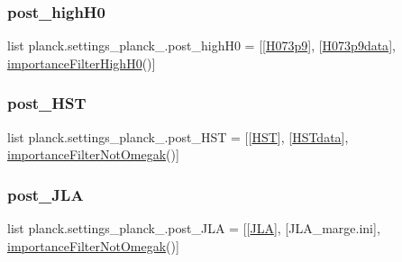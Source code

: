 \subsubsection{\texorpdfstring{post\+\_\+high\+H0}{post\_highH0}}
{\footnotesize\ttfamily list planck.\+settings\+\_\+planck\+\_.\+post\+\_\+high\+H0 = \mbox{[}\mbox{[}\mbox{\hyperlink{namespaceplanck_1_1settings__planck__2015_aafef97d4fa4c419c1ae40783e5ee77bc}{H073p9}}\mbox{]}, \mbox{[}\mbox{\hyperlink{namespaceplanck_1_1settings__planck__2015_a149e32b6407ecf68b56504a5911c02ee}{H073p9data}}\mbox{]}, \mbox{\hyperlink{classplanck_1_1settings__planck__2015_1_1importanceFilterHighH0}{importance\+Filter\+High\+H0}}()\mbox{]}}

\mbox{\label{namespaceplanck_1_1settings__planck__2015_ac605138dcf5992cb2f2365d8ffc1e5c1}} 
\subsubsection{\texorpdfstring{post\+\_\+\+H\+ST}{post\_HST}}
{\footnotesize\ttfamily list planck.\+settings\+\_\+planck\+\_.\+post\+\_\+\+H\+ST = \mbox{[}\mbox{[}\mbox{\hyperlink{namespaceplanck_1_1settings__planck__2015_a07bbdc37cac88460480c8e0389b1c0a2}{H\+ST}}\mbox{]}, \mbox{[}\mbox{\hyperlink{namespaceplanck_1_1settings__planck__2015_a53ddf3faa0f7b268ebbbbcd6bb491d68}{H\+S\+Tdata}}\mbox{]}, \mbox{\hyperlink{classplanck_1_1settings__planck__2015_1_1importanceFilterNotOmegak}{importance\+Filter\+Not\+Omegak}}()\mbox{]}}

\mbox{\label{namespaceplanck_1_1settings__planck__2015_a9687d7f3236fd3e5941ade969f0948c6}} 
\subsubsection{\texorpdfstring{post\+\_\+\+J\+LA}{post\_JLA}}
{\footnotesize\ttfamily list planck.\+settings\+\_\+planck\+\_.\+post\+\_\+\+J\+LA = \mbox{[}\mbox{[}\mbox{\hyperlink{namespaceplanck_1_1settings__planck__2015_a228e145e679385378b71ad2948b85ba1}{J\+LA}}\mbox{]}, \mbox{[}\textquotesingle{}J\+L\+A\+\_\+marge.\+ini\textquotesingle{}\mbox{]}, \mbox{\hyperlink{classplanck_1_1settings__planck__2015_1_1importanceFilterNotOmegak}{importance\+Filter\+Not\+Omegak}}()\mbox{]}}

